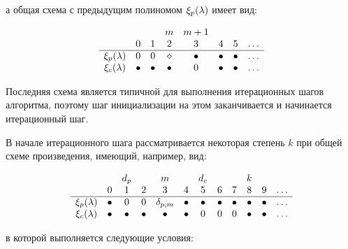 а общая схема с предыдущим полиномом $\xi_p (\lambda)$ имеет вид:

	$$
		\begin{array}{cccccccc}
			                   &         &         & m        & m+1     &         &         & \\
			                   & 0       & 1       & 2        & 3       & 4       & 5       & \dots \\
			\hline
			\xi_p (\lambda) & 0       & 0       & \diamond & \bullet & \bullet & \bullet & \dots \\
			\xi_c (\lambda) & \bullet & \bullet & \bullet  & 0       & \bullet & \bullet & \dots \\
		\end{array}
	$$

Последняя схема является типичной для выполнения итерационных шагов алгоритма, поэтому шаг инициализации на этом заканчивается и начинается
итерационный шаг.

В начале итерационного шага рассматривается некоторая степень $k$ при общей схеме произведения, имеющий, например, вид:

	$$
		\begin{array}{cccccccccccc}
			                   &         & d_p     &         & m            &         & d_c     &         &         & k       &         & \\
			                   & 0       & 1       & 2       & 3            & 4        & 5       & 6       & 7       & 8       & 9       & \dots \\
			\hline
			\xi_p (\lambda) & \bullet & 0       & 0       & \delta_{p,m} & \bullet & \bullet & \bullet & \bullet & \bullet & \bullet & \dots \\
			\xi_c (\lambda) & \bullet & \bullet & \bullet & \bullet      & \bullet & 0       & 0       & 0       & \bullet & \bullet & \dots \\
		\end{array}
	$$

в которой выполняется следующие условия:

